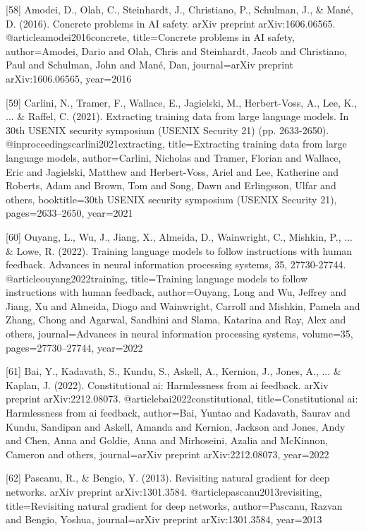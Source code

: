\documentclass{article}
\begin{document}
{[58] Amodei, D., Olah, C., Steinhardt, J., Christiano, P., Schulman, J., & Mané, D. (2016). Concrete problems in AI safety. arXiv preprint arXiv:1606.06565.
@article{amodei2016concrete,
  title={Concrete problems in AI safety},
  author={Amodei, Dario and Olah, Chris and Steinhardt, Jacob and Christiano, Paul and Schulman, John and Man{\'e}, Dan},
  journal={arXiv preprint arXiv:1606.06565},
  year={2016}
}

[59] Carlini, N., Tramer, F., Wallace, E., Jagielski, M., Herbert-Voss, A., Lee, K., ... & Raffel, C. (2021). Extracting training data from large language models. In 30th USENIX security symposium (USENIX Security 21) (pp. 2633-2650).
@inproceedings{carlini2021extracting,
  title={Extracting training data from large language models},
  author={Carlini, Nicholas and Tramer, Florian and Wallace, Eric and Jagielski, Matthew and Herbert-Voss, Ariel and Lee, Katherine and Roberts, Adam and Brown, Tom and Song, Dawn and Erlingsson, Ulfar and others},
  booktitle={30th USENIX security symposium (USENIX Security 21)},
  pages={2633--2650},
  year={2021}
}

[60] Ouyang, L., Wu, J., Jiang, X., Almeida, D., Wainwright, C., Mishkin, P., ... & Lowe, R. (2022). Training language models to follow instructions with human feedback. Advances in neural information processing systems, 35, 27730-27744.
@article{ouyang2022training,
  title={Training language models to follow instructions with human feedback},
  author={Ouyang, Long and Wu, Jeffrey and Jiang, Xu and Almeida, Diogo and Wainwright, Carroll and Mishkin, Pamela and Zhang, Chong and Agarwal, Sandhini and Slama, Katarina and Ray, Alex and others},
  journal={Advances in neural information processing systems},
  volume={35},
  pages={27730--27744},
  year={2022}
}

[61] Bai, Y., Kadavath, S., Kundu, S., Askell, A., Kernion, J., Jones, A., ... & Kaplan, J. (2022). Constitutional ai: Harmlessness from ai feedback. arXiv preprint arXiv:2212.08073.
@article{bai2022constitutional,
  title={Constitutional ai: Harmlessness from ai feedback},
  author={Bai, Yuntao and Kadavath, Saurav and Kundu, Sandipan and Askell, Amanda and Kernion, Jackson and Jones, Andy and Chen, Anna and Goldie, Anna and Mirhoseini, Azalia and McKinnon, Cameron and others},
  journal={arXiv preprint arXiv:2212.08073},
  year={2022}
}

[62] Pascanu, R., & Bengio, Y. (2013). Revisiting natural gradient for deep networks. arXiv preprint arXiv:1301.3584.
@article{pascanu2013revisiting,
  title={Revisiting natural gradient for deep networks},
  author={Pascanu, Razvan and Bengio, Yoshua},
  journal={arXiv preprint arXiv:1301.3584},
  year={2013}
}

}
\end{document}
